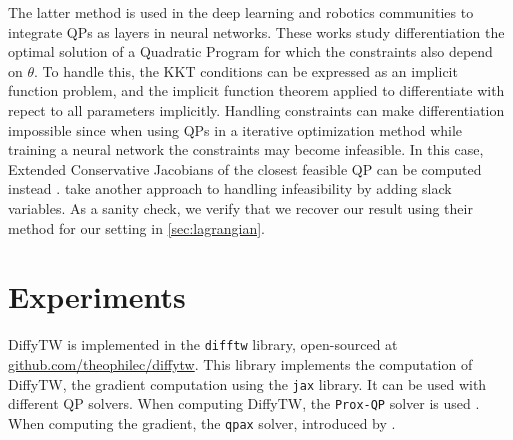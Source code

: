 The latter method is used in the deep learning and robotics communities to integrate QPs as layers in neural networks\citep{QP-Layer,optnet}. These works study differentiation the optimal solution of a Quadratic Program for which the constraints also depend on $\theta$. To handle this, the KKT conditions can be expressed as an implicit function problem, and the implicit function theorem applied to differentiate with repect to all parameters implicitly. Handling constraints can make differentiation impossible since when using QPs in a iterative optimization method while training a neural network the constraints may become infeasible. In this case, Extended Conservative Jacobians of the closest feasible QP can be computed instead \citep{QP-Layer}. \citet{optnet} take another approach to handling infeasibility by adding slack variables. As a sanity check, we verify that we recover our result using their method for our setting in \cref{sec:lagrangian}.

\section{Experiments}\label{sec:diffytw-experiments}
DiffyTW is implemented in the \texttt{difftw} library, open-sourced at \url{github.com/theophilec/diffytw}. This library implements the computation of DiffyTW, the gradient computation using the \texttt{jax} library. It can be used with different QP solvers. When computing DiffyTW, the \texttt{Prox-QP} solver is used \cite{fabian}. When computing the gradient, the \texttt{qpax} solver, introduced by \citet{qpax}.




